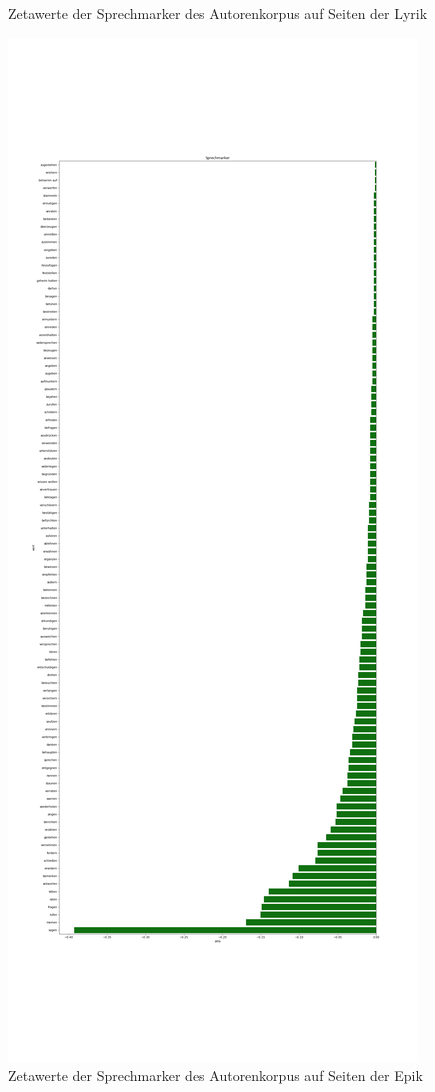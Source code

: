 \documentclass[a4paper,10p]{article}
\begin{document}
\begin{figure}{}
\begin{minipage}[b]{.45\linewidth}
        \caption{Zetawerte der Sprechmarker des Autorenkorpus auf Seiten der Lyrik}
        \label{autoren_sprechmarker}
    \end{minipage}
    \hfill
    \begin{minipage}[b]{.45\linewidth}
        \centering
        \includegraphics[width=\linewidth]{autoren_sprechmarker_lang_pro_wort2.png}
        \caption{Zetawerte der Sprechmarker des Autorenkorpus auf Seiten der Epik} 
        \label{autoren_sprechmarker2}
    \end{minipage}
\end{figure}
\end{document}
